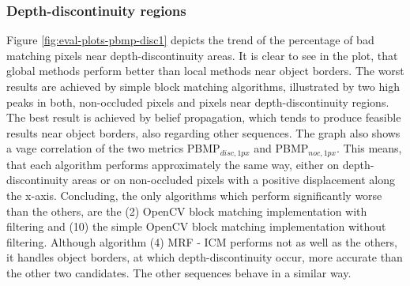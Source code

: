 \begin{table}[h!]
\centering
{}
\caption[Result table for comparison of own implementation]{Result table for comparison of own implementation compared to the simple block-matching implementation in OpenCV (10), focusing on PBMP$_{noc,1px}$}
\label{fig:eval:general:performance2}
\end{table}

\subsubsection{Depth-discontinuity regions}

Figure \ref{fig:eval-plots-pbmp-disc1} depicts the trend of the percentage of bad matching pixels near depth-discontinuity areas.
It is clear to see in the plot, that global methods perform better than local methods near object borders.
The worst results are achieved by simple block matching algorithms, illustrated by two high peaks in both, non-occluded pixels and pixels near depth-discontinuity regions.
The best result is achieved by belief propagation, which tends to produce feasible results near object borders, also regarding other sequences.
\newline\newline\noindent The graph also shows a vage correlation of the two metrics PBMP$_{disc,1px}$ and PBMP$_{noc,1px}$.
This means, that each algorithm performs approximately the same way, either on depth-discontinuity areas or on non-occluded pixels with a positive displacement along the x-axis.
Concluding, the only algorithms which perform significantly worse than the others, are the (2) OpenCV block matching implementation with filtering and (10) the simple OpenCV block matching implementation without filtering.
Although algorithm (4) MRF - ICM performs not as well as the others, it handles object borders, at which depth-discontinuity occur, more accurate than the other two candidates.
The other sequences behave in a similar way.

